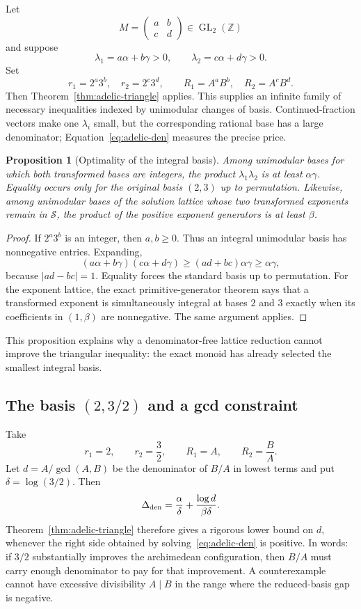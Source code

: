 \documentclass[11pt,oneside]{article}
\newtheorem{proposition}[theorem]{Proposition}
\theoremstyle{definition}
\theoremstyle{remark}
\newcommand{\Z}{\mathbb Z}
\begin{document}
Let
\[
 M=\begin{pmatrix}a&b\\c&d\end{pmatrix}\in\operatorname{GL}_2(\Z)
\]
and suppose
\[
 \lambda_1=a\alpha+b\gamma>0,\qquad
 \lambda_2=c\alpha+d\gamma>0.
\]
Set
\[
 r_1=2^a3^b,\quad r_2=2^c3^d,\qquad
 R_1=A^aB^b,\quad R_2=A^cB^d.
\]
Then Theorem~\ref{thm:adelic-triangle} applies.  This supplies an infinite
family of necessary inequalities indexed by unimodular changes of basis.
Continued-fraction vectors make one $\lambda_i$ small, but the corresponding
rational base has a large denominator; Equation~\eqref{eq:adelic-den} measures
the precise price.

\begin{proposition}[Optimality of the integral basis]\label{prop:integral-basis-opt}
Among unimodular bases for which both transformed bases are integers, the
product $\lambda_1\lambda_2$ is at least $\alpha\gamma$.  Equality occurs only
for the original basis $(2,3)$ up to permutation.  Likewise, among unimodular
bases of the solution lattice whose two transformed exponents remain in
$\mathcal S$, the product of the positive exponent generators is at least
$\beta$.
\end{proposition}
\begin{proof}
If $2^a3^b$ is an integer, then $a,b\ge0$.  Thus an integral unimodular basis
has nonnegative entries.  Expanding,
\[
 (a\alpha+b\gamma)(c\alpha+d\gamma)
 \ge(ad+bc)\alpha\gamma\ge\alpha\gamma,
\]
because $|ad-bc|=1$.  Equality forces the standard basis up to permutation.
For the exponent lattice, the exact primitive-generator theorem says that a transformed
exponent is simultaneously integral at bases $2$ and $3$ exactly when its
coefficients in $(1,\beta)$ are nonnegative.  The same argument applies.
\end{proof}

This proposition explains why a denominator-free lattice reduction cannot
improve the triangular inequality: the exact monoid has already selected the
smallest integral basis.

\subsection{The basis \texorpdfstring{$(2,3/2)$}{(2, 3/2)} and a gcd constraint}

Take
\[
 r_1=2,\qquad r_2=\frac32,\qquad
 R_1=A,\qquad R_2=\frac BA.
\]
Let $d=A/\gcd(A,B)$ be the denominator of $B/A$ in lowest terms and put
$\delta=\log(3/2)$.  Then
\begin{equation}\label{eq:delta-32}
 \Delta_{\rm den}=\frac{\alpha}{\delta}
 +\frac{\log d}{\beta\delta}.
\end{equation}
Theorem~\ref{thm:adelic-triangle} therefore gives a rigorous lower bound on
$d$, whenever the right side obtained by solving~\eqref{eq:adelic-den} is
positive.  In words: if $3/2$ substantially improves the archimedean
configuration, then $B/A$ must carry enough denominator to pay for that
improvement.  A counterexample cannot have excessive divisibility
$A\mid B$ in the range where the reduced-basis gap is negative.
\end{document}
